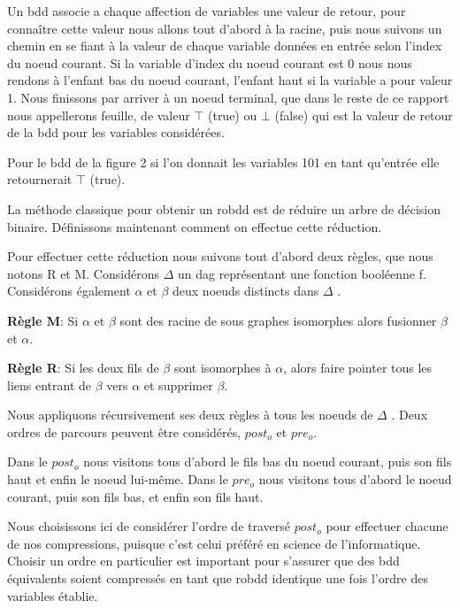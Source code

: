 \documentclass[french]{article}
\begin{document}
Un bdd associe a chaque affection de variables une valeur de retour, pour connaître cette valeur nous allons tout d'abord à la racine, puis nous suivons un chemin en se fiant à la valeur de chaque variable données en entrée selon l'index du noeud courant. Si la variable d'index du noeud courant est 0 nous nous rendons à l'enfant bas du noeud courant, l'enfant haut si la variable a pour valeur 1. Nous finissons par arriver à un noeud terminal, que dans le reste de ce rapport nous appellerons feuille, de valeur \(\top\) (true) ou \(\bot\) (false) qui est la valeur de retour de la bdd pour les variables considérées.

Pour le bdd de la figure 2 si l'on donnait les variables 101 en tant qu'entrée elle retournerait \(\top\) (true). 

La méthode classique pour obtenir un robdd est de réduire un arbre de décision binaire. Définissons maintenant comment on effectue cette réduction.

Pour effectuer cette réduction nous suivons tout d'abord deux règles, que nous notons R et M.
\vspace{5mm} 
Considérons \(\Delta\) un dag représentant une fonction booléenne f. Considérons également \(\alpha\) et \(\beta\)  deux noeuds distincts dans \(\Delta\) .

\textbf{Règle M}: Si \(\alpha\) et \(\beta\) sont des racine de sous graphes isomorphes alors fusionner \(\beta\) et \(\alpha\).

\textbf{Règle R}: Si les deux fils de \(\beta\) sont isomorphes à \(\alpha\), alors faire pointer tous les liens entrant de \(\beta\) vers \(\alpha\) et supprimer \(\beta\).

Nous appliquons récursivement ses deux règles à tous les noeuds de \(\Delta\) .
\vspace{5mm} 
\newpage
Deux ordres de parcours peuvent être considérés, \(post_{o}\) et \(pre_{o}\).

Dans le \(post_{o}\) nous visitons tous d'abord le fils bas du noeud courant, puis son fils haut et enfin le noeud lui-même.
Dans le \(pre_{o}\) nous visitons tous d'abord le noeud courant, puis son fils bas, et enfin son fils haut.

Nous choisissons ici de considérer l'ordre de traversé \(post_{o}\) pour effectuer chacune de nos compressions, puisque c'est celui préféré en science de l'informatique. Choisir un ordre en particulier est important pour s'assurer que des bdd équivalents soient compressés en tant que robdd identique une fois l'ordre des variables établie.
\vspace{5mm} 
\end{document}
